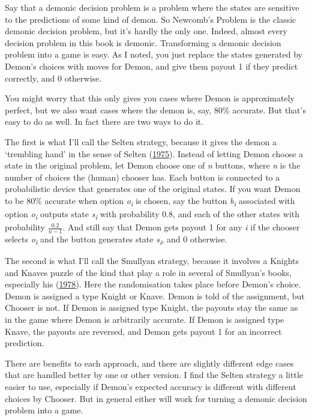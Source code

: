 \documentclass[
  12pt,
  letterpaper,
  DIV=11,
  numbers=noendperiod]{scrreprt}
\begin{document}
Say that a demonic decision problem is a problem where the states are
sensitive to the predictions of some kind of demon. So Newcomb's Problem
is the classic demonic decision problem, but it's hardly the only one.
Indeed, almost every decision problem in this book is demonic.
Transforming a demonic decision problem into a game is easy. As I noted,
you just replace the states generated by Demon's choices with moves for
Demon, and give them payout 1 if they predict correctly, and 0
otherwise.

You might worry that this only gives you cases where Demon is
approximately perfect, but we also want cases where the demon is, say,
80\% accurate. But that's easy to do as well. In fact there are two ways
to do it.

The first is what I'll call the Selten strategy, because it gives the
demon a `trembling hand' in the sense of Selten
(\protect\hyperlink{ref-Selten1975}{1975}). Instead of letting Demon
choose a state in the original problem, let Demon choose one of \emph{n}
buttons, where \emph{n} is the number of choices the (human) chooser
has. Each button is connected to a probabilistic device that generates
one of the original states. If you want Demon to be 80\% accurate when
option \emph{o\textsubscript{i}} is chosen, say the button
\emph{b\textsubscript{i}} associated with option
\emph{o\textsubscript{i}} outputs state \emph{s\textsubscript{i}} with
probability 0.8, and each of the other states with probability
\(\frac{0.2}{n - 1}\). And still say that Demon gets payout 1 for any
\emph{i} if the chooser selects \emph{o\textsubscript{i}} and the button
generates state \emph{s\textsubscript{i}}, and 0 otherwise.

The second is what I'll call the Smullyan strategy, because it involves
a Knights and Knaves puzzle of the kind that play a role in several of
Smullyan's books, especially his
(\protect\hyperlink{ref-Smullyan1978}{1978}). Here the randomisation
takes place before Demon's choice. Demon is assigned a type Knight or
Knave. Demon is told of the assignment, but Chooser is not. If Demon is
assigned type Knight, the payouts stay the same as in the game where
Demon is arbitrarily accurate. If Demon is assigned type Knave, the
payouts are reversed, and Demon gets payout 1 for an incorrect
prediction.

There are benefits to each approach, and there are slightly different
edge cases that are handled better by one or other version. I find the
Selten strategy a little easier to use, especially if Demon's expected
accuracy is different with different choices by Chooser. But in general
either will work for turning a demonic decision problem into a game.
\end{document}
